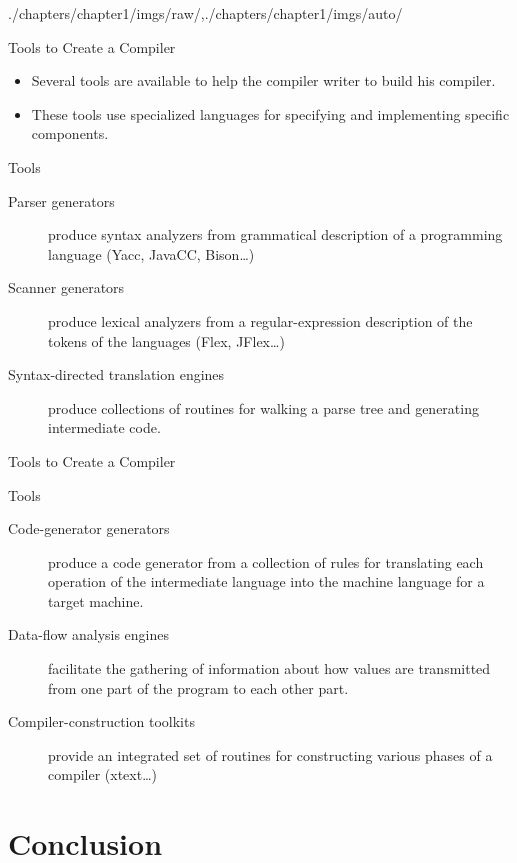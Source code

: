 \begin{graphicspathcontext}{{./chapters/chapter1/imgs/raw/},{./chapters/chapter1/imgs/auto/}}
\begin{bibunit}[apalike]
\tableofcontentslide[sectionstyle={show/shaded},subsectionstyle={hide/hide/hide},subsubsectionstyle={hide/hide/hide/hide}]

\begin{frame}{Tools to Create a Compiler}
	\begin{itemize}
	\item Several tools are available to help the compiler writer to build his compiler.
	\item These tools use specialized languages for specifying and implementing specific components.
	\end{itemize}
	\begin{block}{Tools}\smaller
	\begin{description}
	\item[Parser generators] produce syntax analyzers from grammatical description of a programming language (Yacc, JavaCC, Bison\dots)
	\item[Scanner generators] produce lexical analyzers from a regular-expression description of the tokens of the languages (Flex, JFlex\dots)
	\item[Syntax-directed translation engines] produce collections of routines for walking a parse tree and generating intermediate code.
	\end{description}
	\end{block}
\end{frame}

\begin{frame}{Tools to Create a Compiler}
	\begin{block}{Tools}\smaller
	\begin{description}
	\item[Code-generator generators] produce a code generator from a collection of rules for translating each operation of the intermediate language into the machine language for a target machine.
	\item[Data-flow analysis engines] facilitate the gathering of information about how values are transmitted from one part of the program to each other part.
	\item[Compiler-construction toolkits] provide an integrated set of routines for constructing various phases of a compiler (xtext\dots)
	\end{description}
	\end{block}
\end{frame}

\section{Conclusion}


\end{bibunit}
\end{graphicspathcontext}
